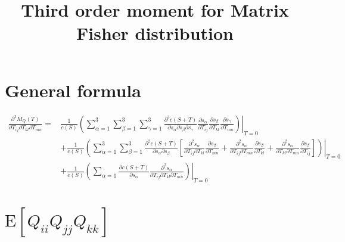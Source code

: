 \documentclass[10pt]{article}
\title{\vspace{-4ex}\textbf{Third order moment for Matrix Fisher distribution\vspace{-4ex}}}
\date{}
\newcommand{\expect}[1]{\ensuremath{\mathrm{E}\left[ #1 \right]}}
\begin{document}
\maketitle

\section{General formula}

\begin{align}
	\frac{\partial^3 M_Q(T)}{\partial T_{ij} \partial T_{kl} \partial T_{mn}} = &\frac{1}{c(S)}\left.\left( \sum_{\alpha=1}^{3}\sum_{\beta=1}^{3}\sum_{\gamma=1}^{3} \frac{\partial^3 c(S+T)}{\partial s_\alpha \partial s_\beta \partial s_\gamma} \frac{\partial s_\alpha}{\partial T_{ij}} \frac{\partial s_\beta}{\partial T_{kl}} \frac{\partial s_\gamma}{\partial T_{mn}} \right)\right|_{T=0} \nonumber \\ 
	&+ \frac{1}{c(S)} \left.\left( \sum_{\alpha=1}^3\sum_{\beta=1}^3 \frac{\partial^2 c(S+T)}{\partial s_\alpha \partial s_\beta } \left[ \frac{\partial^2 s_\alpha}{\partial T_{ij} \partial T_{kl}} \frac{\partial s_\beta}{\partial T_{mn}} + \frac{\partial^2 s_\alpha}{\partial T_{ij} \partial T_{mn}} \frac{\partial s_\beta}{\partial T_{kl}} + \frac{\partial^2 s_\alpha}{\partial T_{kl} \partial T_{mn}} \frac{\partial s_\beta}{\partial T_{ij}} \right] \right)\right|_{T=0} \nonumber \\
	&+\frac{1}{c(S)} \left.\left( \sum_{\alpha=1} \frac{\partial c(S+T)}{\partial s_\alpha}\frac{\partial^3 s_\alpha}{\partial T_{ij} \partial T_{kl} \partial T_{mn}} \right)\right|_{T=0}
\end{align}

\section{$\expect{Q_{ii}Q_{jj}Q_{kk}}$}
\end{document}
